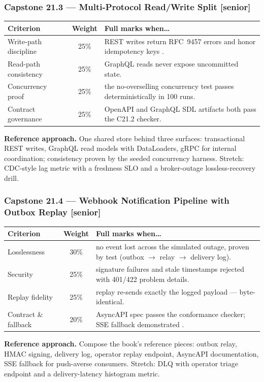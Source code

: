 \subsubsection*{Capstone 21.3 --- Multi-Protocol Read/Write Split [senior]}
\begin{center}\small
\begin{tabularx}{\textwidth}{l c X}
\toprule
\textbf{Criterion} & \textbf{Weight} & \textbf{Full marks when\ldots} \\
\midrule
Write-path discipline & 25\% & REST writes return RFC~9457 errors and honor idempotency keys \cite{rfc9457}. \\
Read-path consistency & 25\% & GraphQL reads never expose uncommitted state. \\
Concurrency proof & 25\% & the no-overselling concurrency test passes deterministically in 100 runs. \\
Contract governance & 25\% & OpenAPI and GraphQL SDL artifacts both pass the C21.2 checker. \\
\bottomrule
\end{tabularx}
\end{center}
\textbf{Reference approach.} One shared store behind three surfaces:
transactional REST writes, GraphQL read models with DataLoaders, gRPC for
internal coordination; consistency proven by the seeded concurrency
harness. Stretch: CDC-style lag metric with a freshness SLO and a
broker-outage lossless-recovery drill.

\subsubsection*{Capstone 21.4 --- Webhook Notification Pipeline with Outbox Replay [senior]}
\begin{center}\small
\begin{tabularx}{\textwidth}{l c X}
\toprule
\textbf{Criterion} & \textbf{Weight} & \textbf{Full marks when\ldots} \\
\midrule
Losslessness & 30\% & no event lost across the simulated outage, proven by test (outbox $\to$ relay $\to$ delivery log). \\
Security & 25\% & signature failures and stale timestamps rejected with 401/422 problem details. \\
Replay fidelity & 25\% & replay re-sends exactly the logged payload --- byte-identical. \\
Contract \& fallback & 20\% & AsyncAPI spec passes the conformance checker; SSE fallback demonstrated \cite{asyncapi}. \\
\bottomrule
\end{tabularx}
\end{center}
\textbf{Reference approach.} Compose the book's reference pieces: outbox
relay, HMAC signing, delivery log, operator replay endpoint, AsyncAPI
documentation, SSE fallback for push-averse consumers. Stretch: DLQ with
operator triage endpoint and a delivery-latency histogram metric.

